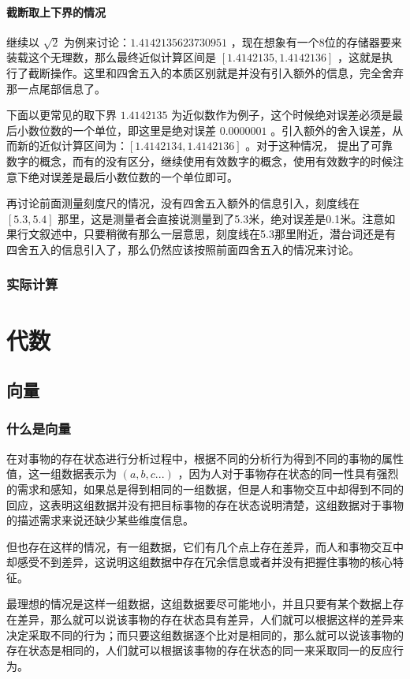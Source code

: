 \documentclass[12pt,oneside]{book}
\begin{document}
\subsection{截断取上下界的情况}
继续以 $\sqrt{2}$ 为例来讨论：$ 1.4142135623730951 $ ，现在想象有一个8位的存储器要来装载这个无理数，那么最终近似计算区间是 $ [1.4142135, 1.4142136] $ ，这就是执行了截断操作。这里和四舍五入的本质区别就是并没有引入额外的信息，完全舍弃那一点尾部信息了。

下面以更常见的取下界 $ 1.4142135 $ 为近似数作为例子，这个时候绝对误差必须是最后小数位数的一个单位，即这里是绝对误差 $ 0.0000001 $ 。引入额外的舍入误差，从而新的近似计算区间为：$ [1.4142134, 1.4142136] $ 。对于这种情况，\cite{近似计算初步} 提出了可靠数字的概念，而有的没有区分，继续使用有效数字的概念，使用有效数字的时候注意下绝对误差是最后小数位数的一个单位即可。

再讨论前面测量刻度尺的情况，没有四舍五入额外的信息引入，刻度线在 $[5.3, 5.4]$ 那里，这是测量者会直接说测量到了5.3米，绝对误差是0.1米。注意如果行文叙述中，只要稍微有那么一层意思，刻度线在5.3那里附近，潜台词还是有四舍五入的信息引入了，那么仍然应该按照前面四舍五入的情况来讨论。

\section{实际计算}





\part{代数}
\chapter{向量}
\section{什么是向量}
在对事物的存在状态进行分析过程中，根据不同的分析行为得到不同的事物的属性值，这一组数据表示为 $(a, b, c...)$ ，因为人对于事物存在状态的同一性具有强烈的需求和感知，如果总是得到相同的一组数据，但是人和事物交互中却得到不同的回应，这表明这组数据并没有把目标事物的存在状态说明清楚，这组数据对于事物的描述需求来说还缺少某些维度信息。

但也存在这样的情况，有一组数据，它们有几个点上存在差异，而人和事物交互中却感受不到差异，这说明这组数据中存在冗余信息或者并没有把握住事物的核心特征。

最理想的情况是这样一组数据，这组数据要尽可能地小，并且只要有某个数据上存在差异，那么就可以说该事物的存在状态具有差异，人们就可以根据这样的差异来决定采取不同的行为；而只要这组数据逐个比对是相同的，那么就可以说该事物的存在状态是相同的，人们就可以根据该事物的存在状态的同一来采取同一的反应行为。
\end{document}
